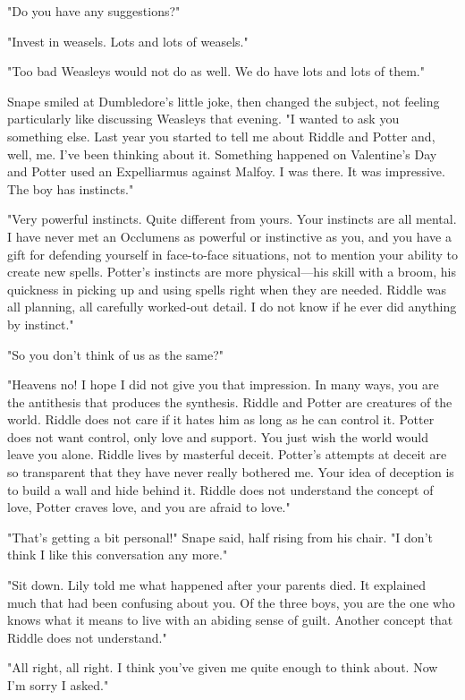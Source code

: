 "Do you have any suggestions?"

"Invest in weasels. Lots and lots of weasels."

"Too bad Weasleys would not do as well. We do have lots and lots of them."

Snape smiled at Dumbledore's little joke, then changed the subject, not feeling particularly like discussing Weasleys that evening. "I wanted to ask you something else. Last year you started to tell me about Riddle and Potter and, well, me. I've been thinking about it. Something happened on Valentine's Day and Potter used an Expelliarmus against Malfoy. I was there. It was impressive. The boy has{\el} instincts."

"Very powerful instincts. Quite different from yours. Your instincts are all mental. I have never met an Occlumens as powerful or instinctive as you, and you have a gift for defending yourself in face-to-face situations, not to mention your ability to create new spells. Potter's instincts are more physical—his skill with a broom, his quickness in picking up and using spells right when they are needed. Riddle was all planning, all carefully worked-out detail. I do not know if he ever did anything by instinct."

"So you don't think of us as the same?"

"Heavens no! I hope I did not give you that impression. In many ways, you are the antithesis that produces the synthesis. Riddle and Potter are creatures of the world. Riddle does not care if it hates him as long as he can control it. Potter does not want control, only love and support. You just wish the world would leave you alone. Riddle lives by masterful deceit. Potter's attempts at deceit are so transparent that they have never really bothered me. Your idea of deception is to build a wall and hide behind it. Riddle does not understand the concept of love, Potter craves love, and you are afraid to love."

"That's getting a bit personal!" Snape said, half rising from his chair. "I don't think I like this conversation any more."

"Sit down. Lily told me what happened after your parents died. It explained much that had been confusing about you. Of the three boys, you are the one who knows what it means to live with an abiding sense of guilt. Another concept that Riddle does not understand."

"All right, all right. I think you've given me quite enough to think about. Now I'm sorry I asked."

